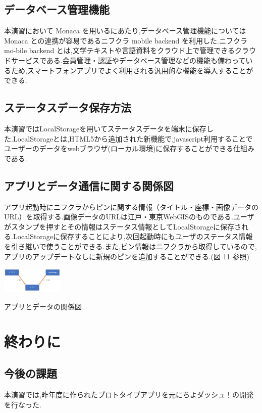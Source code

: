 \documentclass[a4paper, twoside]{jarticle}
\makeatletter
\newenvironment{figurehere}
  {\def\@captype{figure}}
  {}
\makeatother
\begin{document}
\begin{multicols}{2}
\subsection{データベース管理機能}
本演習において Monaca を用いるにあたり,データベース管理機能については Monaca との連携が容易であるニフクラ mobile backend を利用した.ニフクラ mo-bile backend とは,文学テキストや言語資料をクラウド上で管理できるクラウドサービスである.会員管理・認証やデータベース管理などの機能も備わっているため,スマートフォンアプリでよく利用される汎用的な機能を導入することができる.

\subsection{ステータスデータ保存方法}
本演習ではLocalStorageを用いてステータスデータを端末に保存した.LocalStorageとは,HTML5から追加された新機能で,javascript利用することでユーザーのデータをwebブラウザ(ローカル環境)に保存することができる仕組みである.

\subsection{アプリとデータ通信に関する関係図}
アプリ起動時にニフクラからピンに関する情報（タイトル・座標・画像データのURL）を取得する.画像データのURLは江戸・東京WebGISのものである.ユーザがスタンプを押すとその情報はステータス情報としてLocalStorageに保存される.LocalStorageに保存することにより,次回起動時にもユーザのステータス情報を引き継いで使うことができる.また,ピン情報はニフクラから取得しているので,アプリのアップデートなしに新規のピンを追加することができる.(図 11 参照)
\begin{figurehere}
\begin{center}
\includegraphics[bb=30 100 550 500,width=3cm]{./image12.png}%
\end{center}
\caption{アプリとデータの関係図}\label{fig:12}
\end{figurehere}


\section{終わりに}

\subsection{今後の課題}
本演習では,昨年度に作られたプロトタイプアプリを元にちよダッシュ！の開発を行なった.



\end{multicols} %
\end{document}
